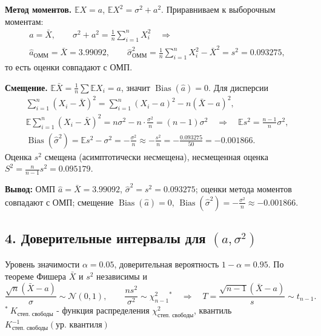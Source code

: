 \documentclass[12pt]{spbstu-task}
\newcommand{\E}{\mathbb{E}}
\DeclareMathOperator{\Bias}{Bias}
\begin{document}
\textbf{Метод моментов.} \(\E X = a\), \(\E X^2 = \sigma^2 + a^2\). Приравниваем к выборочным моментам:
\begin{gather*}
  a = \bar{X},\qquad \sigma^2 + a^2 = \frac{1}{n}\sum_{i=1}^{n}X_i^2
  \quad\Rightarrow\\
  \hat{a}_{\text{ОММ}} = \bar{X} = 3.99092,\qquad
  \hat{\sigma}^2_{\text{ОММ}} = \frac{1}{n}\sum_{i=1}^{n}X_i^2 - \bar{X}^2 = s^2 = 0.093275,
\end{gather*}
то есть оценки совпадают с ОМП.

\textbf{Смещение.} \(\E\bar{X} = \frac{1}{n}\sum\E X_i = a\), значит \(\Bias(\hat{a}) = 0\). Для дисперсии
\begin{gather*}
  \sum_{i=1}^{n}\left(X_i - \bar{X}\right)^2 = \sum_{i=1}^{n}(X_i - a)^2 - n\left(\bar{X} - a\right)^2,\\
  \E\sum_{i=1}^{n}\left(X_i - \bar{X}\right)^2 = n\sigma^2 - n\cdot\frac{\sigma^2}{n} = (n - 1)\sigma^2
  \quad\Rightarrow\quad \E s^2 = \frac{n - 1}{n}\sigma^2,\\
  \Bias(\hat{\sigma}^2) = \E s^2 - \sigma^2 = -\frac{\sigma^2}{n} \approx -\frac{s^2}{n} = -\frac{0.093275}{50} = -0.001866.
\end{gather*}
Оценка \(s^2\) смещена (асимптотически несмещена), несмещенная оценка
\(S^2 = \frac{n}{n - 1}s^2 = 0.095179\).

\noindent\textbf{Вывод:} ОМП \(\hat{a} = \bar{X} = 3.99092\), \(\hat{\sigma}^2 = s^2 = 0.093275\); оценки метода моментов
совпадают с ОМП; смещение \(\Bias(\hat{a}) = 0\), \(\Bias(\hat{\sigma}^2) = -\frac{\sigma^2}{n} \approx -0.001866\).

\subsection*{4. Доверительные интервалы для \((a, \sigma^2)\)}
Уровень значимости \(\alpha = 0.05\), доверительная вероятность \(1 - \alpha = 0.95\).
По теореме Фишера \(\bar{X}\) и \(s^2\) независимы и
\begin{displaymath}
  \frac{\sqrt{n}\left(\bar{X} - a\right)}{\sigma} \sim \mathcal{N}(0, 1),\qquad
  \frac{ns^2}{\sigma^2} \sim \chi^2_{n - 1}{}^{*}
  \quad\Rightarrow\quad
  T = \frac{\sqrt{n - 1}\left(\bar{X} - a\right)}{s} \sim t_{n - 1}.
\end{displaymath}
\noindent\(^{*}\ K_{\text{степ. свободы}}\) - функция распределения \(\chi^2_{\text{степ. свободы}}\),
квантиль \(K^{-1}_{\text{степ. свободы}}(\text{ур. квантиля})\)
\end{document}
